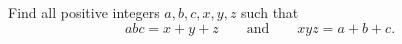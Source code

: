 Find all positive integers $a,b,c,x,y,z$ such that
\[
abc=x+y+z\qquad\text{and}\qquad xyz=a+b+c .
\]
